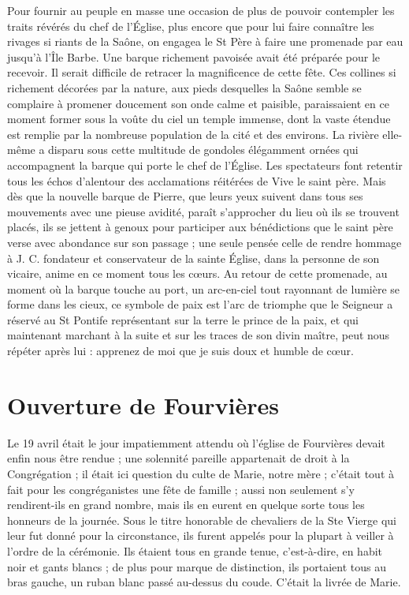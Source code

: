 Pour fournir au peuple en masse une occasion de plus de pouvoir contempler les traits révérés du chef de l'Église, plus encore que pour lui faire connaître les rivages si riants de la Saône, on engagea le St Père à faire une promenade par eau jusqu'à l'Île Barbe. Une barque richement pavoisée avait été préparée pour le recevoir. Il serait difficile de retracer la magnificence de cette fête. Ces collines si richement décorées par la nature, aux pieds desquelles la Saône semble se complaire à promener doucement son onde calme et paisible, paraissaient en ce moment former sous la voûte du ciel un temple immense, dont la vaste étendue est remplie par la nombreuse population de la cité et des environs. La rivière elle-même a disparu sous cette multitude de gondoles élégamment ornées qui accompagnent la barque qui porte le chef de l'Église. Les spectateurs font retentir tous les échos d'alentour des acclamations réitérées de Vive le saint père. Mais dès que la nouvelle barque de Pierre, que leurs yeux suivent dans tous ses mouvements avec une pieuse avidité, paraît s'approcher du lieu où ils se trouvent placés, ils se jettent à genoux pour participer aux bénédictions que le saint père verse avec abondance sur son passage ; une seule pensée celle de rendre hommage
à J. C. fondateur et conservateur de la sainte Église, dans la personne de son vicaire, anime en ce moment tous les cœurs. Au retour de cette promenade, au moment où la barque touche au port, un arc-en-ciel tout rayonnant de lumière se forme dans les cieux, ce symbole de paix est l'arc de triomphe que le Seigneur a réservé au St Pontife représentant sur la terre le prince de la paix, et qui maintenant marchant à la suite et sur les traces de son divin maître, peut nous répéter après lui : apprenez de moi que je suis doux et humble de cœur.

\section*{Ouverture de Fourvières}
Le 19 avril était le jour impatiemment attendu où l'église de Fourvières devait enfin nous être rendue ; une solennité pareille appartenait de droit à la Congrégation ; il était ici question du culte de Marie, notre mère ; c'était tout à fait pour les congréganistes une fête de famille ; aussi non seulement s'y rendirent-ils en grand nombre, mais ils en eurent en quelque sorte tous les honneurs de la journée. Sous le titre honorable de chevaliers de la Ste Vierge qui leur fut donné pour la circonstance, ils furent appelés pour la plupart à veiller à l'ordre de la cérémonie. Ils étaient tous en grande tenue, c'est-à-dire, en habit noir et gants blancs ; de plus pour marque de distinction, ils portaient tous au bras gauche, un ruban blanc passé au-dessus du coude. C'était la livrée de Marie.

